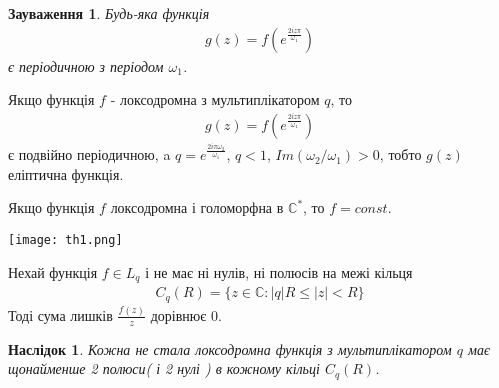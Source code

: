 \documentclass[12pt,a4paper]{article}
\begin{document}
\vspace{1,5cm}

\newtheorem{zauv}{Зауваження}
\begin{zauv} 
Будь-яка функція 
\begin{equation}\label{eq1}
\begin{array}{l}
g(z)=f(e^{\frac{2iz\pi}{\omega_{1}}})
\end{array}
\end{equation}
є періодичною з періодом $\omega_{1}$.
\end{zauv}

\vspace{1cm}


\begin{twerd}
 Якщо функція $f$ - локсодромна з мультиплікатором $q$, то  
\[\begin{array}{l}
g(z)=f(e^{\frac{2iz\pi}{\omega_{1}}})
\end{array}\] 
є подвійно періодичною, a\hspace{0,5cm} $q=e^{\frac{2i\pi \omega_{2}}{ \omega_{1}}}$,\hspace{0,5cm} $q<1$, \hspace{0,5cm}  $Im(\omega_{2}/\omega_{1})>0$, тобто $g(z)$ еліптична функція.
\end{twerd}

\vspace{1cm}

\begin{thm}
Якщо функція $f$ локсодромна і голоморфна в $\mathbb{C}^{*}$, то $f=const$.
\end{thm}

\texttt{[image: th1.png]}
\vspace{1,5cm}

 
\begin{thm}
 Нехай функція $f\in L_{q}$ і не має ні нулів, ні полюсів на межі кільця 
\begin{equation}\label{th21}
\begin{array}{l}
C_{q}(R)=\lbrace z\in \mathbb{C}:\left |q  \right |R\leq \left |z  \right |<R \rbrace
\end{array}
\end{equation} \label{C_{q}(R)}
 Тоді сума лишків $\frac{f(z)}{z}$ дорівнює $0$.
\end{thm}

\vspace{1,5cm}

\newtheorem{nasl}{Наслідок}
\begin{nasl}
 Кожна не стала локсодромна функція з мультиплікатором $q$ має щонайменше 2 полюси( і 2 нулі ) в кожному кільці $C_{q}(R)$.
\end{nasl}
\end{document}
